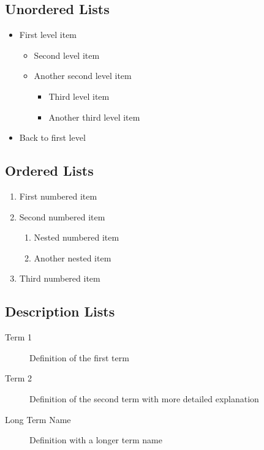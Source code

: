 \documentclass[12pt,a4paper,twoside]{article}
\begin{document}
\subsection{Unordered Lists}

\begin{itemize}
    \item First level item
    \begin{itemize}
        \item Second level item
        \item Another second level item
        \begin{itemize}
            \item Third level item
            \item Another third level item
        \end{itemize}
    \end{itemize}
    \item Back to first level
\end{itemize}

\subsection{Ordered Lists}

\begin{enumerate}
    \item First numbered item
    \item Second numbered item
    \begin{enumerate}
        \item Nested numbered item
        \item Another nested item
    \end{enumerate}
    \item Third numbered item
\end{enumerate}

\subsection{Description Lists}

\begin{description}
    \item[Term 1] Definition of the first term
    \item[Term 2] Definition of the second term with more detailed explanation
    \item[Long Term Name] Definition with a longer term name
\end{description}
\end{document}
